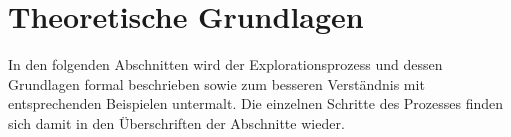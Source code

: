 \chapter{Theoretische Grundlagen}\label{chap_foundation}
In den folgenden Abschnitten wird der Explorationsprozess und dessen Grundlagen formal beschrieben sowie zum besseren Verständnis mit entsprechenden Beispielen untermalt. Die einzelnen Schritte des Prozesses finden sich damit in den  Überschriften der Abschnitte wieder.





